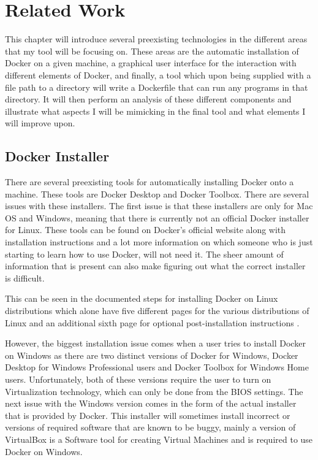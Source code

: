 \chapter{Related Work}
\label{ch:relatedwork}

This chapter will introduce several preexisting technologies in the different areas that my tool will be focusing on. These areas are the automatic installation of Docker on a given machine, a graphical user interface for the interaction with different elements of Docker, and finally, a tool which upon being supplied with a file path to a directory will write a Dockerfile that can run any programs in that directory. It will then perform an analysis of these different components and illustrate what aspects I will be mimicking in the final tool and what elements I will improve upon.

\break

\section{Docker Installer}
\label{sec:installer}

There are several preexisting tools for automatically installing Docker onto a machine. These tools are Docker Desktop and Docker Toolbox. There are several issues with these installers. The first issue is that these installers are only for Mac OS and Windows, meaning that there is currently not an official Docker installer for Linux. These tools can be found on Docker's official website along with installation instructions and a lot more information on which someone who is just starting to learn how to use Docker, will not need it. The sheer amount of information that is present can also make figuring out what the correct installer is difficult.

This can be seen in the documented steps for installing Docker on Linux distributions which alone have five different pages for the various distributions of Linux and an additional sixth page for optional post-installation instructions \cite{dockerDocs}.

However, the biggest installation issue comes when a user tries to install Docker on Windows as there are two distinct versions of Docker for Windows, Docker Desktop for Windows Professional users and Docker Toolbox for Windows Home users. Unfortunately, both of these versions require the user to turn on Virtualization technology, which can only be done from the BIOS settings. The next issue with the Windows version comes in the form of the actual installer that is provided by Docker. This installer will sometimes install incorrect or versions of required software that are known to be buggy, mainly a version of VirtualBox is a Software tool for creating Virtual Machines and is required to use Docker on Windows.

